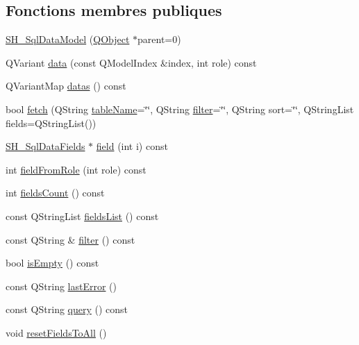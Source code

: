 \subsection*{Fonctions membres publiques}
\begin{DoxyCompactItemize}
\item 
\hyperlink{classSH__SqlDataModel_a946716dc9b74e3ec4a70778319ceb3f8}{S\-H\-\_\-\-Sql\-Data\-Model} (\hyperlink{classQObject}{Q\-Object} $\ast$parent=0)
\item 
Q\-Variant \hyperlink{classSH__SqlDataModel_aa4664329d52c2d2cba2bacc42fa1a564}{data} (const Q\-Model\-Index \&index, int role) const 
\item 
Q\-Variant\-Map \hyperlink{classSH__SqlDataModel_a24db284b370930b57e2261a7a72e2da8}{datas} () const 
\item 
bool \hyperlink{classSH__SqlDataModel_ab6c206088250a66ddc8cb8d33a38e421}{fetch} (Q\-String \hyperlink{classSH__SqlDataModel_afced07f7b9e6fecd349a5428a1a4615e}{table\-Name}=\char`\"{}\char`\"{}, Q\-String \hyperlink{classSH__SqlDataModel_a1f3b35273198f9c67ca4bca5b29876e9}{filter}=\char`\"{}\char`\"{}, Q\-String sort=\char`\"{}\char`\"{}, Q\-String\-List fields=Q\-String\-List())
\item 
\hyperlink{classSH__SqlDataFields}{S\-H\-\_\-\-Sql\-Data\-Fields} $\ast$ \hyperlink{classSH__SqlDataModel_a92c51d5c1f6aca08a7ee566ece1e4cb6}{field} (int i) const 
\item 
int \hyperlink{classSH__SqlDataModel_a3c6539114dd06aa8043e7a4e9762f6f4}{field\-From\-Role} (int role) const 
\item 
int \hyperlink{classSH__SqlDataModel_a46f0951fd358e30892a982ebd34e43c2}{fields\-Count} () const 
\item 
const Q\-String\-List \hyperlink{classSH__SqlDataModel_a571bdc1f9592bd13f98fd748563d46c0}{fields\-List} () const 
\item 
const Q\-String \& \hyperlink{classSH__SqlDataModel_aa86018df823c85798574ec8d63413c1a}{filter} () const 
\item 
bool \hyperlink{classSH__SqlDataModel_ad85bfde0f7ffb06172eb5543e26d1331}{is\-Empty} () const 
\item 
const Q\-String \hyperlink{classSH__SqlDataModel_ad9aaa1569cd20c3c0e18d39eeb6caa43}{last\-Error} ()
\item 
const Q\-String \hyperlink{classSH__SqlDataModel_aee909d0a29715d02d920fcf854bfbba2}{query} () const 
\item 
void \hyperlink{classSH__SqlDataModel_ad0477d16e78ba808250e2054952f9833}{reset\-Fields\-To\-All} ()

\end{DoxyCompactItemize}
